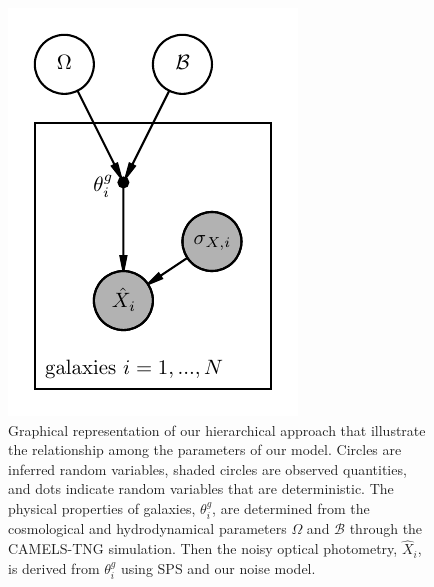 \begin{figure}[ht]
\vskip 0.2in
\begin{center}
    \centerline{\includegraphics[width=0.6\columnwidth]{figs/graph.pdf}}
    \caption{
        Graphical representation of our hierarchical approach that illustrate
        the relationship among the parameters of our model. 
        Circles are inferred random variables, shaded circles are observed
        quantities, and dots indicate random variables that are deterministic.
        The physical properties of galaxies, $\theta^g_i$, are determined from
        the cosmological and hydrodynamical parameters $\Omega$ and
        $\mathcal{B}$ through the CAMELS-TNG simulation. 
        Then the noisy optical photometry, $\hat{X}_i$, is derived from
        $\theta^g_i$ using SPS and our noise model. 
    }\label{fig:graph}
\end{center}
\vskip -0.2in
\end{figure}


